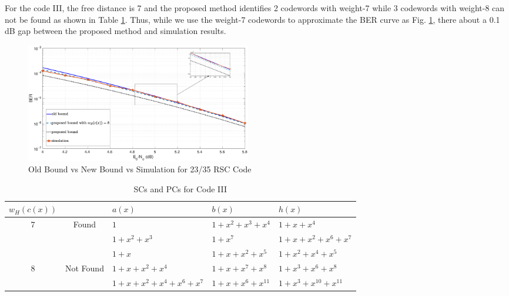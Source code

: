 For the code III, the free distance is 7 and the proposed method identifies 2 codewords with weight-7 while 3 codewords with weight-8 can not be found as shown in Table \ref{code-tables-3}. Thus, while we use the weight-7 codewords to approximate the BER curve as Fig. \ref{simFig3}, there about a 0.1 dB gap between the proposed method and simulation results.

\begin{figure}[htbp]
	\centering
	\includegraphics[width=0.48\textwidth]{./Images/RSC_23_35_lower_weights4.eps}
	\caption{Old Bound vs New Bound vs Simulation for 23/35 RSC Code}
	\label{simFig3}
\end{figure}

\begin{table}[htbp]
		\caption{SCs and PCs for Code III}
		\centering
		\begin{tabularx}{0.48\textwidth}{|c|c|XXX} 
			\toprule
			$w_H(c(x))$&~& $a(x)$ & $b(x)$ & $h(x)$ \\ %
			\midrule
			7&Found&$1$ & $1+x^2+x^3+x^4$ & $1+x+x^{4}$\\
			  &~&$1+x^2+x^3$ & $1+x^7$ & $1+x+x^2+x^6+x^7$\\
			\cline{1-5}
			&&$1+x$ 						& $1+x+x^2+x^5$ 			& $1+x^2+x^4+x^5$\\
			8&Not Found&$1+x+x^2+x^4$ 				& $1+x+x^7+x^8$ 			& $1+x^3+x^6+x^8$\\
			&&$1+x+x^2+x^4+x^6+x^7$ 	& $1+x+x^6+x^{11}$ 			& $1+x^3+x^{10}+x^{11}$\\
			\bottomrule
		\end{tabularx}		
		\label{code-tables-3}
	\end{table}






